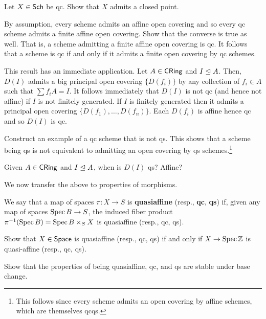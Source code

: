 \documentclass[11pt]{article}
\begin{document}
\begin{exercise}
Let $X\in\operatorname{\mathsf{Sch}}$ be qc. Show that $X$ admits a closed point.
\end{exercise}

\begin{exercise}
By assumption, every scheme admits an affine open covering and so every qc scheme admits a finite affine open covering. Show that the converse is true as well. That is, a scheme admitting a finite affine open covering is qc. It follows that a scheme is qc if and only if it admits a finite open covering by qc schemes.
\end{exercise}

This result has an immediate application. Let $A\in\operatorname{\mathsf{CRing}}$ and $I\trianglelefteq A$. Then, $D(I)$ admits a big principal open covering $\{D(f_i)\}$ by any collection of $f_i\in A$ such that $\sum f_iA=I$. It follows immediately that $D(I)$ is not qc (and hence not affine) if $I$ is not finitely generated. If $I$ is finitely generated then it admits a principal open covering $\{D(f_1),\ldots,D(f_n)\}$. Each $D(f_i)$ is affine hence qc and so $D(I)$ is qc.

\begin{exercise}
Construct an example of a qc scheme that is not qs. This shows that a scheme being qs is not equivalent to admitting an open covering by qs schemes.\footnote{This follows since every scheme admits an open covering by affine schemes, which are themselves qcqs.}
\end{exercise}

\begin{exercise}
Given $A\in\operatorname{\mathsf{CRing}}$ and $I\trianglelefteq A$, when is $D(I)$ qs? Affine?
\end{exercise}

We now transfer the above to properties of morphisms.

\begin{definition}
We say that a map of spaces $\pi: X\to S$ is \textbf{quasiaffine} (resp., \textbf{qc}, \textbf{qs}) if, given any map of spaces $\operatorname{Spec} B\to S$, the induced fiber product $\pi^{-1}(\operatorname{Spec} B)=\operatorname{Spec} B\times_SX$ is quasiaffine (resp., qc, qs).
\end{definition}

\begin{exercise}
Show that $X\in\operatorname{\mathsf{Space}}$ is quasiaffine (resp., qc, qs) if and only if $X\to\operatorname{Spec}\mathbb{Z}$ is quasi-affine (resp., qc, qs). 
\end{exercise}

\begin{exercise}
Show that the properties of being quasiaffine, qc, and qs are stable under base change.
\end{exercise}
\end{document}
